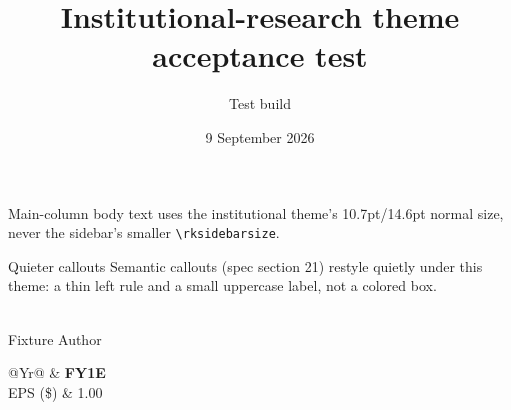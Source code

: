 \documentclass[theme=institutional-research,publication-type=equity-research]{reportkit}
\title{Institutional-research theme acceptance test}
\author{Test build}
\date{9 September 2026}
\begin{document}
\begin{researchfrontpage}

\begin{ratingstrip}
\end{ratingstrip}

\begin{whatschanged}
\end{whatschanged}

\begin{researchmain}
Main-column body text uses the institutional theme's 10.7pt/14.6pt normal size,
never the sidebar's smaller \texttt{\textbackslash rksidebarsize}.

\begin{principle}{Quieter callouts}
Semantic callouts (spec section 21) restyle quietly under this theme: a thin
left rule and a small uppercase label, not a colored box.
\end{principle}
\end{researchmain}\begin{researchsidebar}
\begin{analystblock}
\\
\textcolor{Muted}{Fixture Author}
\end{analystblock}

\begin{marketdatablock}
\end{marketdatablock}

\begin{estimatesblock}
\begin{tabularx}{\linewidth}{@{}Yr@{}}
& \textbf{FY1E}\\
\midrule
EPS (\$) & 1.00\\
\end{tabularx}
\end{estimatesblock}
\end{researchsidebar}
\end{researchfrontpage}
\end{document}
